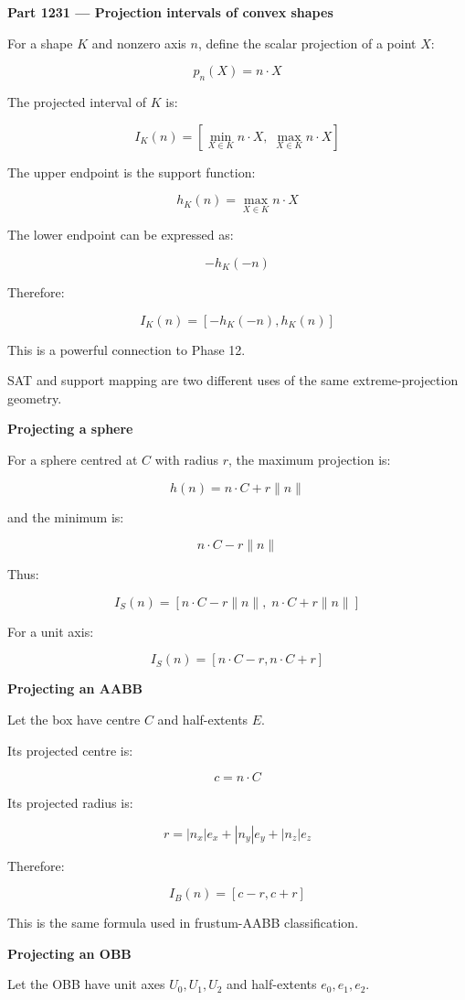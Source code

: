\textbf{Part 1231 --- Projection intervals of convex shapes}

For a shape \(K\) and nonzero axis \(n\), define the scalar projection of a point \(X\):

\[
p_n(X)=n\cdot X
\]

The projected interval of \(K\) is:

\[
\boxed{ I_K(n)= \left[ \min_{X\in K}n\cdot X,\; \max_{X\in K}n\cdot X \right] }
\]

The upper endpoint is the support function:

\[
\boxed{ h_K(n)=\max_{X\in K}n\cdot X }
\]

The lower endpoint can be expressed as:

\[
\boxed{ -h_K(-n) }
\]

Therefore:

\[
\boxed{ I_K(n)=[-h_K(-n),h_K(n)] }
\]

This is a powerful connection to Phase 12.

SAT and support mapping are two different uses of the same extreme-projection geometry.

\textbf{Projecting a sphere}

For a sphere centred at \(C\) with radius \(r\), the maximum projection is:

\[
h(n)=n\cdot C+r\|n\|
\]

and the minimum is:

\[
n\cdot C-r\|n\|
\]

Thus:

\[
\boxed{ I_S(n)= [n\cdot C-r\|n\|,\; n\cdot C+r\|n\|] }
\]

For a unit axis:

\[
I_S(n)=[n\cdot C-r,n\cdot C+r]
\]

\textbf{Projecting an AABB}

Let the box have centre \(C\) and half-extents \(E\).

Its projected centre is:

\[
c=n\cdot C
\]

Its projected radius is:

\[
\boxed{ r=|n_x|e_x+|n_y|e_y+|n_z|e_z }
\]

Therefore:

\[
\boxed{I_B(n)=[c-r,c+r]}
\]

This is the same formula used in frustum-AABB classification.

\textbf{Projecting an OBB}

Let the OBB have unit axes \(U_0,U_1,U_2\) and half-extents \(e_0,e_1,e_2\).

